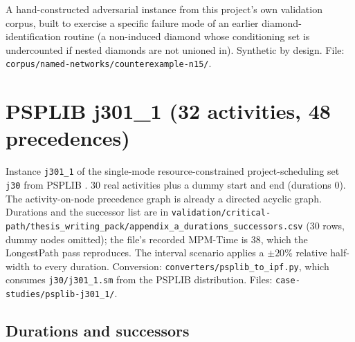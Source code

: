 \documentclass[12pt]{report}
\providecommand{\filepath}[1]{\nolinkurl{#1}}
\begin{document}
A hand-constructed adversarial instance from this project's own validation corpus, built
to exercise a specific failure mode of an earlier diamond-identification routine (a
non-induced diamond whose conditioning set is undercounted if nested diamonds are not
unioned in). Synthetic by design. File:
\filepath{corpus/named-networks/counterexample-n15/}.

\section{PSPLIB j301\_1 (32 activities, 48 precedences)}
\label{sec:appA-psplib}

Instance \filepath{j301_1} of the single-mode resource-constrained project-scheduling set
\texttt{j30} from PSPLIB \cite{kolisch1997psplib}. 30 real activities plus a dummy start
and end (durations 0). The activity-on-node precedence graph is already a directed acyclic
graph. Durations and the successor list are in
\filepath{validation/critical-path/thesis\_writing\_pack/appendix\_a\_durations\_successors.csv}
(30 rows, dummy nodes omitted); the file's recorded MPM-Time is 38, which the LongestPath
pass reproduces. The interval scenario applies a $\pm 20\%$ relative half-width to every
duration. Conversion: \filepath{converters/psplib\_to\_ipf.py}, which consumes
\filepath{j30/j301\_1.sm} from the PSPLIB distribution. Files:
\filepath{case-studies/psplib-j301\_1/}.

\subsection{Durations and successors}
\end{document}

